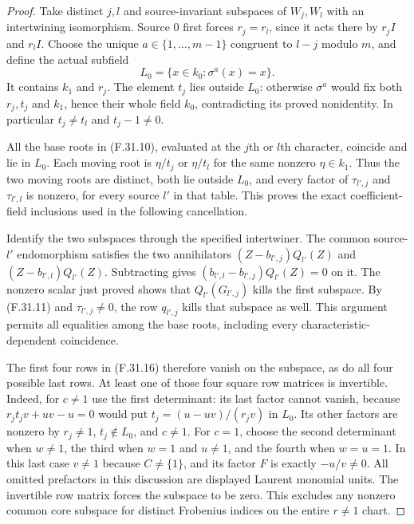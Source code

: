 \begin{proof}
Take distinct $j,l$ and source-invariant
subspaces of $W_j,W_l$ with an intertwining
isomorphism. Source $0$ first forces
$r_j=r_l$, since it acts there by
$r_jI$ and $r_lI$.
Choose the unique $a\in\{1,\ldots,m-1\}$
congruent to $l-j$ modulo $m$, and define
the actual subfield
\[
       L_0=\{x\in k_0:\sigma^a(x)=x\}.
                                                               \tag{F.31.17}
\]
It contains $k_1$ and $r_j$.
The element $t_j$ lies outside $L_0$:
otherwise $\sigma^a$ would fix both
$r_j,t_j$ and $k_1$, hence their whole
field $k_0$, contradicting its proved
nonidentity. In particular
$t_j\ne t_l$ and $t_j-1\ne0$.

All the base roots in (F.31.10), evaluated
at the $j$th or $l$th character, coincide
and lie in $L_0$.
Each moving root is $\eta/t_j$ or
$\eta/t_l$ for the same nonzero
$\eta\in k_1$.
Thus the two moving roots are distinct,
both lie outside $L_0$, and every factor
of $\tau_{l',j}$ and $\tau_{l',l}$ is
nonzero, for every source $l'$ in that table.
This proves the exact coefficient-field
inclusions used in the following cancellation.

Identify the two subspaces through the
specified intertwiner. The common
source-$l'$ endomorphism satisfies the
two annihilators
$(Z-b_{l',j})Q_{l'}(Z)$ and
$(Z-b_{l',l})Q_{l'}(Z)$.
Subtracting gives
$(b_{l',l}-b_{l',j})Q_{l'}(Z)=0$ on it.
The nonzero scalar just proved shows
that $Q_{l'}(G_{l',j})$ kills the first
subspace. By (F.31.11) and
$\tau_{l',j}\ne0$, the row $q_{l',j}$
kills that subspace as well.
This argument permits all equalities
among the base roots, including every
characteristic-dependent coincidence.

The first four rows in (F.31.16) therefore
vanish on the subspace, as do all four
possible last rows.
At least one of those four square row
matrices is invertible. Indeed, for
$c\ne1$ use the first determinant:
its last factor cannot vanish, because
$r_jt_jv+uv-u=0$ would put
$t_j=(u-uv)/(r_jv)$ in $L_0$.
Its other factors are nonzero by
$r_j\ne1$, $t_j\notin L_0$, and $c\ne1$.
For $c=1$, choose the second determinant
when $w\ne1$, the third when $w=1$
and $u\ne1$, and the fourth when
$w=u=1$. In this last case $v\ne1$
because $C\ne\{1\}$, and its factor
$F$ is exactly $-u/v\ne0$.
All omitted prefactors in this discussion
are displayed Laurent monomial units.
The invertible row matrix forces the
subspace to be zero. This excludes any
nonzero common core subspace for distinct
Frobenius indices on the entire $r\ne1$ chart.


\end{proof}
